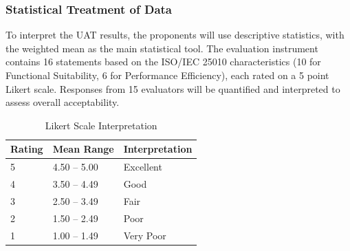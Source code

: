 \documentclass[12pt, letterpaper]{article}
\begin{document}
\subsubsection{Statistical Treatment of Data}
\hspace*{2em} To interpret the UAT results, the proponents will use descriptive statistics, with the weighted mean as the main statistical tool. The evaluation instrument contains 16 statements based on the ISO/IEC 25010 characteristics (10 for Functional Suitability, 6 for Performance Efficiency), each rated on a 5 point Likert scale. Responses from 15 evaluators will be quantified and interpreted to assess overall acceptability.

\begin{table}[h]
\centering
\caption{Likert Scale Interpretation}
\begin{tabular}{p{3cm} p{4cm} p{4cm}}
\toprule
\textbf{Rating} & \textbf{Mean Range} & \textbf{Interpretation} \\
\midrule
5 & 4.50 – 5.00 & Excellent \\
4 & 3.50 – 4.49 & Good \\
3 & 2.50 – 3.49 & Fair\\
2 & 1.50 – 2.49 & Poor \\
1 & 1.00 – 1.49 & Very Poor \\
\bottomrule
\end{tabular}
\end{table}
\end{document}
